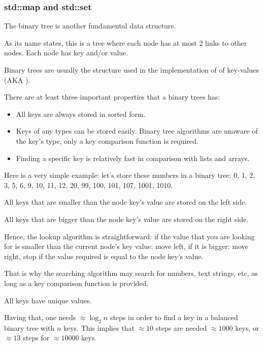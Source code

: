 \subsubsection{std::map and std::set}

The binary tree is another fundamental data structure.

As its name states, this is a tree where each node has at most 2 links to other nodes.
Each node has key and/or value.

Binary trees are usually the structure used in the implementation of  of key-values (\ac{AKA} ).

There are at least three important properties that a binary trees has:
\begin{itemize}
\item All keys are always stored in sorted form.
\item Keys of any types can be stored easily.
Binary tree algorithms are unaware of the key's type, 
only a key comparison function is required.
\item 
Finding a specific key is relatively fast in comparison with lists and arrays.
\end{itemize}

Here is a very simple example: let's store these numbers in a binary tree:
0, 1, 2, 3, 5, 6, 9, 10, 11, 12, 20, 99, 100, 101, 107, 1001, 1010.



All keys that are smaller than the node key's value are stored on the left side.

All keys that are bigger than the node key's value are stored on the right side.

Hence, the lookup algorithm is straightforward: if the value that you are looking for is smaller than the current node's key value:
move left, if it is bigger: move right, stop if the value required is equal to the node key's value.

That is why the searching algorithm may search for numbers, text strings, etc, as long as 
a key comparison function is provided.

All keys have unique values.

Having that, one needs $\approx \log_{2} n$ steps in order to find a key in a balanced binary tree with $n$ keys.
This implies that $\approx 10$ steps are needed $\approx 1000$ keys, or $\approx 13$ 
steps for $\approx 10000$ keys.

